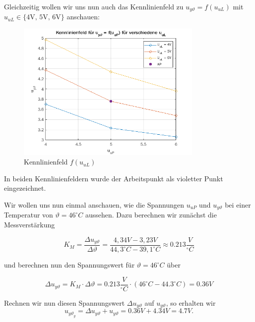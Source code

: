 \documentclass{report}
\begin{document}
\newpage

Gleichzeitig wollen wir uns nun auch das Kennlinienfeld zu $u_{y\vartheta} = f(u_{uL})$ mit $u_{uL} \in \{\text{4V, 5V, 6V}\}$ anschauen:

\begin{figure}[h]
  \centering
  \includegraphics[width=0.8\textwidth]{../assets/images/RTP/kennlinieA12rtp1.png}
  \caption{Kennlinienfeld $f(u_{uL})$}
  \label{fig:kennux}
\end{figure}

In beiden Kennlinienfeldern wurde der Arbeitspunkt als violetter Punkt eingezeichnet.

Wir wollen uns nun einmal anschauen, wie die Spannungen $u_{uP}$ und $u_{y\vartheta}$ bei einer Temperatur von $\vartheta = 46^{\circ}C$ aussehen. Dazu berechnen wir zunächst die Messverstärkung

\begin{equation}
  \label{eq:12}
  K_{M} = \frac{\Delta u_{y\vartheta}}{\Delta \vartheta} = \frac{4,34V-3,23V}{44,3^{\circ}C-39,1^{\circ}C} \approx 0.213 \frac{V}{^{\circ}C}
\end{equation}

und berechnen nun den Spannungswert für $\vartheta = 46^{\circ}C$ über

\begin{equation}
  \label{eq:13}
  \Delta u_{y\vartheta} = K_{M} \cdot \Delta \vartheta = 0.213\frac{V}{^{\circ}C} \cdot (46^{\circ}C - 44.3^{\circ}C) = 0.36V
\end{equation}

Rechnen wir nun diesen Spannungswert $\Delta u_{y\vartheta}$ auf $u_{y\vartheta}$, so erhalten wir
\begin{equation}
  \label{eq:14}
  u_{y\vartheta}_{g} = \Delta u_{y\vartheta} + u_{y\vartheta} = 0.36V + 4.34V = 4.7V.
\end{equation}
\end{document}
